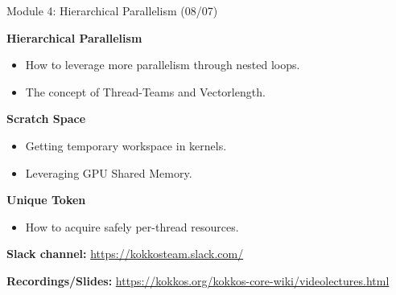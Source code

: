\begin{frame}{Module 4: Hierarchical Parallelism (08/07)}

	\vspace{5pt}
	\textbf{Hierarchical Parallelism}
	\begin{itemize}
        \item How to leverage more parallelism through nested loops.
        \item The concept of Thread-Teams and Vectorlength.
	\end{itemize}

	\vspace{5pt}
	\textbf{Scratch Space}
	\begin{itemize}
        \item Getting temporary workspace in kernels.
        \item Leveraging GPU Shared Memory.
	\end{itemize}

        \vspace{5pt}
        \textbf{Unique Token}
        \begin{itemize}
        \item How to acquire safely per-thread resources.
        \end{itemize}

	\vspace{10pt}
    \textbf{Slack channel:} {\scriptsize \url{https://kokkosteam.slack.com/}}
	
	\vspace{10pt}
	\textbf{Recordings/Slides:} {\scriptsize \url{https://kokkos.org/kokkos-core-wiki/videolectures.html}}

\end{frame}



